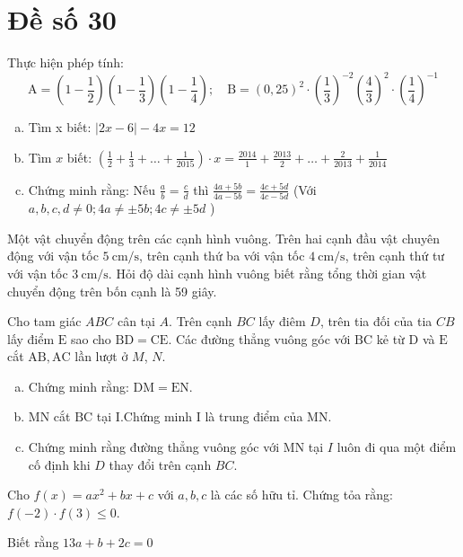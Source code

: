 \onehalfspacing
\section{Đề số 30}

\begin{bt} 
    Thực hiện phép tính:
    $$
    \mathrm{A}=\left(1-\frac{1}{2}\right)\left(1-\frac{1}{3}\right)\left(1-\frac{1}{4}\right) ; \quad \mathrm{B}=(0,25)^2 \cdot\left(\frac{1}{3}\right)^{-2}\left(\frac{4}{3}\right)^2 \cdot\left(\frac{1}{4}\right)^{-1}
    $$
\loigiai{}
\end{bt}

\begin{bt}
    \hfill
	\begin{enumerate}[a.]
        \item Tìm x biết: $|2 x-6|-4 x=12$
        \item Tìm $x$ biết: $\left(\frac{1}{2}+\frac{1}{3}+\ldots+\frac{1}{2015}\right) \cdot x=\frac{2014}{1}+\frac{2013}{2}+\ldots+\frac{2}{2013}+\frac{1}{2014}$
        \item Chứng minh rằng: Nếu $\frac{a}{b}=\frac{c}{d}$ thì $\frac{4 a+5 b}{4 a-5 b}=\frac{4 c+5 d}{4 c-5 d}$
        (Với $a, b, c, d \neq 0 ; 4 a \neq \pm 5 b ; 4 c \neq \pm 5 d$ )
    \end{enumerate}
	\loigiai{} 
\end{bt}

\begin{bt}
    Một vật chuyển động trên các cạnh hình vuông. Trên hai cạnh đầu vật chuyên động với vận tốc $5 \mathrm{~cm} / \mathrm{s}$, trên cạnh thứ ba với vận tốc $4 \mathrm{~cm} / \mathrm{s}$, trên cạnh thứ tư với vận tốc $3 \mathrm{~cm} / \mathrm{s}$. Hỏi độ dài cạnh hình vuông biết rằng tổng thời gian vật chuyển động trên bốn cạnh là 59 giây.
	\loigiai{}
\end{bt}

\begin{bt}
    Cho tam giác $A B C$ cân tại $A$. Trên cạnh $B C$ lấy điêm $D$, trên tia đối của tia $C B$ lấy điểm $\mathrm{E}$ sao cho $\mathrm{BD}=\mathrm{CE}$. Các đường thẳng vuông góc với $\mathrm{BC}$ kẻ từ $\mathrm{D}$ và $\mathrm{E}$ cắt $\mathrm{AB}, \mathrm{AC}$ lần lượt ở $M$, $N$.
    \begin{enumerate}[a.]
        \item  Chứng minh rằng: $\mathrm{DM}=\mathrm{EN}$.
        \item $\mathrm{MN}$ cắt $\mathrm{BC}$ tại $\mathrm{I}$.Chứng minh $\mathrm{I}$ là trung điểm của $\mathrm{MN}$.
        \item Chứng minh rằng đường thẳng vuông góc với $\mathrm{MN}$ tại $I$ luôn đi qua một điểm cố định khi $D$ thay đổi trên cạnh $BC$.
    \end{enumerate}
	\loigiai{}
\end{bt}

\begin{bt}
    Cho $f(x)=a x^2+b x+c$ với $a, b, c$ là các số hữu tỉ. Chứng tỏa rằng: $f(-2) \cdot f(3) \leq 0$.

    Biết rằng $13 a+b+2 c=0$
\loigiai{}
\end{bt}


